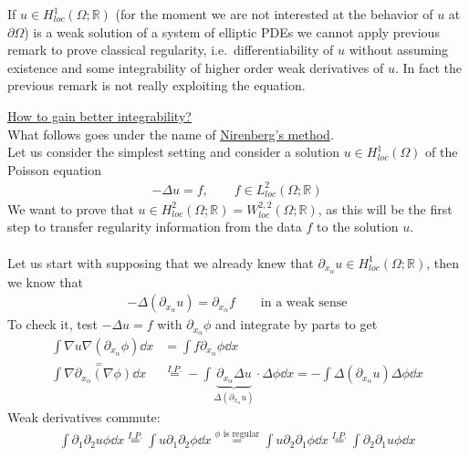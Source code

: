 If \( u \in  H_{loc}^{1} (\Omega; \mathbb{R})  \) (for the moment we are not interested at the behavior of \( u \) at \( \partial \Omega \)) is a weak solution of a system of elliptic PDEs we cannot apply previous remark to prove classical regularity, i.e.\ differentiability of \( u \) without assuming existence and some integrability of higher order weak derivatives of \( u \). In fact the previous remark is not really exploiting the equation.\\
\par
\underline{How to gain better integrability?}\\
What   follows goes under the name of \underline{Nirenberg's method}.\\
Let us consider the simplest setting and consider a solution \( u \in H_{loc}^{1} (\Omega)  \) of the Poisson equation
\begin{gather}
    - \Delta u = f, \qquad f \in L_{loc}^{2} (\Omega ;\mathbb{R})
\end{gather}
We want to prove that \( u \in H_{loc}^{2} (\Omega ; \mathbb{R}) =W_{loc}^{2,2} (\Omega ;\mathbb{R})  \), as this will be the first step to transfer regularity information from the data \( f \) to the solution \( u \).\\
\\
Let us start with supposing that we already knew that \( \partial_{x_{\alpha }} u \in H_{loc}^{1} (\Omega ;\mathbb{R})  \), then we know that
\begin{gather}
    -\Delta (\partial_{x_{\alpha }} u) = \partial_{x_{\alpha }} f \qquad \text{in a weak sense}
\end{gather}
To check it, test \( -\Delta u=f \) with \( \partial_{x_{\alpha }} \phi  \) and integrate by parts to get
\begin{align}
    \int \nabla u \nabla (\partial_{x_{\alpha }}\phi )  \dd{x}           & = \int f \partial_{x_{\alpha }}\phi  \dd{x}                                                                                                                                                       \\
    \overset{=}{\int \nabla \partial_{x_{\alpha }}(\nabla \phi)  \dd{x}} & \overset{I.P.}{=} - \int \underbrace{\partial_{x_{\alpha }} \Delta u}_{\Delta (\partial_{x_{\alpha }} u) } \cdot \Delta \phi \dd{x} = - \int \Delta (\partial_{x_{\alpha }}u) \Delta \phi  \dd{x}
\end{align}
Weak derivatives commute:
\begin{gather}
    \int \partial_{1}\partial_{2} u \phi  \dd{x} \overset{I.P.}{=} \int u \partial_{1} \partial_{2} \phi  \dd{x} \overset{\phi \text{ is regular}}{=} \int u \partial_{2}\partial_{1} \phi \dd{x} \overset{I.P.}{=} \int \partial_{2}\partial_{1}u \phi \dd{x}
\end{gather}
